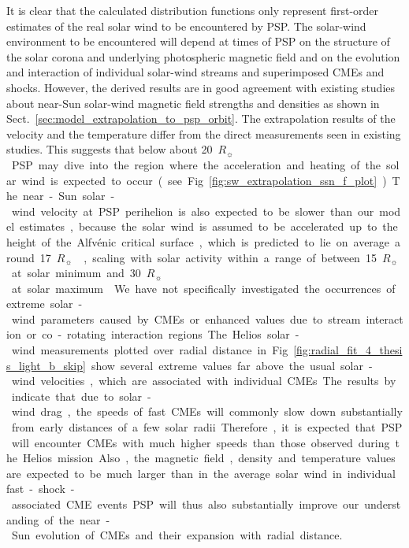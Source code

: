 \documentclass[]{aa}
\newcommand{\Rs}{$R_\sun{}$}
\begin{document}
        It is clear that the calculated distribution functions only represent first-order estimates of the real solar wind to be encountered by PSP. The solar-wind environment to be encountered will depend at times of PSP on the structure of the solar corona and underlying photospheric magnetic field and on the evolution and interaction of individual solar-wind streams and superimposed CMEs and shocks. However, the derived results are in good agreement with existing studies about near-Sun solar-wind magnetic field strengths and densities as shown in Sect.~\ref{sec:model_extrapolation_to_psp_orbit}. The extrapolation results of the velocity and the temperature differ from the direct measurements seen in existing studies. This suggests that below about \SI{20}{\Rs} PSP may dive into the region where the acceleration and heating of the solar wind is expected to occur (see Fig.~\ref{fig:sw_extrapolation_ssn_f_plot}). The near-Sun solar-wind velocity at PSP perihelion is also expected to be slower than our model estimates, because the solar wind is assumed to be accelerated up to the height of the Alfvénic critical surface, which is predicted to lie on average around \SI{17}{\Rs} \citep[e.g.,][]{Sittler1999,Exarhos2000}, scaling with solar activity within a range of between \SI{15}{\Rs} at solar minimum and \SI{30}{\Rs} at solar maximum \citep{Katsikas2010,Goelzer2014}.

        We have not specifically investigated the occurrences of extreme solar-wind parameters caused by CMEs or enhanced values due to stream interaction or co-rotating interaction regions. The Helios solar-wind measurements plotted over radial distance in Fig.~\ref{fig:radial_fit_4_thesis_light_b_skip} show several extreme values far above the usual solar-wind velocities, which are associated with individual CMEs. The results by \citet{Sachdeva2017} indicate that due to solar-wind drag, the speeds of fast CMEs will commonly slow down substantially from early distances of a few solar radii. Therefore, it is expected that PSP will encounter CMEs with much higher speeds than those observed during the Helios mission. Also, the magnetic field, density and temperature values are expected to be much larger than in the average solar wind in individual fast-shock-associated CME events. PSP will thus also substantially improve our understanding of the near-Sun evolution of CMEs and their expansion with radial distance.
\end{document}
